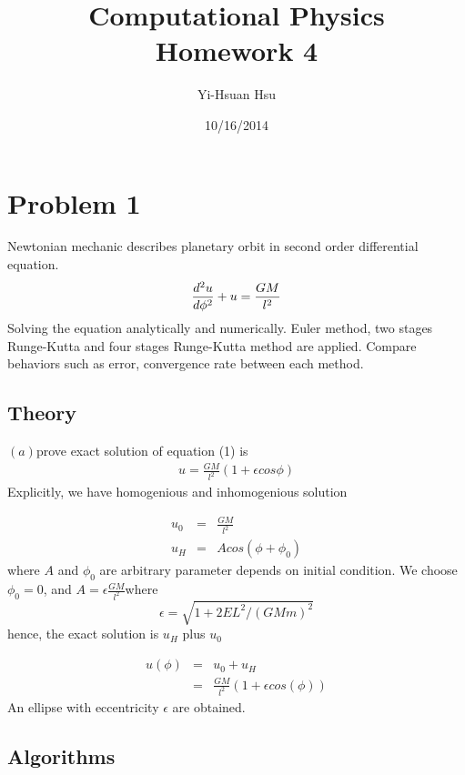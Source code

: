 \documentclass[12pt]{article}
\begin{document}
\title{Computational Physics \\ Homework 4}
\author{Yi-Hsuan Hsu}
\date{10/16/2014}
\maketitle

\section{Problem 1}
Newtonian mechanic describes planetary orbit in second order differential equation.    
\begin{equation}
		\frac{d^2u}{d\phi^2}+u=\frac{GM}{l^2}\\
\end{equation}
Solving the equation analytically and numerically. Euler method, two stages Runge-Kutta and four stages Runge-Kutta method are applied. Compare behaviors such as error, convergence rate between each method.


\subsection{Theory}
$(a)$prove exact solution of equation (1) is
\begin{eqnarray}
u=\frac{GM}{l^2}(1+\epsilon cos\phi)
\end{eqnarray}
Explicitly, we have homogenious and inhomogenious solution 

\begin{eqnarray}
	u_{0}&=&\frac{GM}{l^2}\\
	u_{H}&=&Acos(\phi+\phi_0)
\end{eqnarray}
where $A$ and $\phi_0$ are arbitrary parameter depends on initial condition. We choose $\phi_0=0$, and $A=\epsilon\frac{GM}{l^2}$where
\begin{equation}
	\epsilon=\sqrt{1+2EL^2/(GMm)^2}
\end{equation}
hence, the exact solution is $u_H$ plus $u_0$

\begin{eqnarray}
	u(\phi)&=&u_0+u_H\nonumber\\
		&=&\frac{GM}{l^2}(1+\epsilon cos(\phi))	
\end{eqnarray}
An ellipse with eccentricity $\epsilon$ are obtained.

\subsection{Algorithms}
\end{document}

